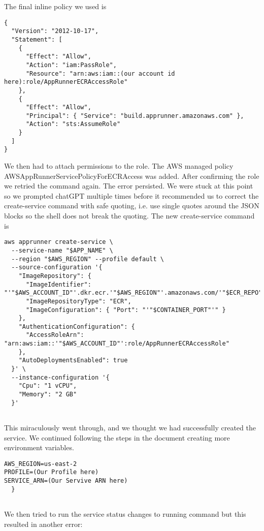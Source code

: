 \noindent The final inline policy we used is

\begin{verbatim}
{
  "Version": "2012-10-17",
  "Statement": [
    { 
      "Effect": "Allow", 
      "Action": "iam:PassRole", 
      "Resource": "arn:aws:iam::(our account id here):role/AppRunnerECRAccessRole" 
    }, 
    {
      "Effect": "Allow",
      "Principal": { "Service": "build.apprunner.amazonaws.com" },
      "Action": "sts:AssumeRole"
    }
  ]
}

\end{verbatim}


\noindent We then had to attach permissions to the role. The AWS managed policy AWSAppRunnerServicePolicyForECRAccess was added. After confirming the role we retried the command again. The error persisted. We were stuck at this point so we prompted chatGPT multiple times before it recommended us to correct the create-service command with safe quoting, i.e. use single quotes around the JSON blocks so the shell does not break the quoting. The new create-service command is

\begin{verbatim}
aws apprunner create-service \
  --service-name "$APP_NAME" \
  --region "$AWS_REGION" --profile default \
  --source-configuration '{
    "ImageRepository": {
      "ImageIdentifier": "'"$AWS_ACCOUNT_ID"'.dkr.ecr.'"$AWS_REGION"'.amazonaws.com/'"$ECR_REPO"':'"$IMAGE_TAG"'",
      "ImageRepositoryType": "ECR",
      "ImageConfiguration": { "Port": "'"$CONTAINER_PORT"'" }
    },
    "AuthenticationConfiguration": {
      "AccessRoleArn": "arn:aws:iam::'"$AWS_ACCOUNT_ID"':role/AppRunnerECRAccessRole"
    },
    "AutoDeploymentsEnabled": true
  }' \
  --instance-configuration '{
    "Cpu": "1 vCPU",
    "Memory": "2 GB"
  }'


\end{verbatim}

\noindent This miraculously went through, and we thought we had successfully created the service. We continued following the steps in the document creating more environment variables. 

\begin{verbatim}
AWS_REGION=us-east-2
PROFILE=(Our Profile here)
SERVICE_ARN=(Our Servive ARN here)
  }


\end{verbatim}

\noindent We then tried to run the service status changes to running command but this resulted in another error:

